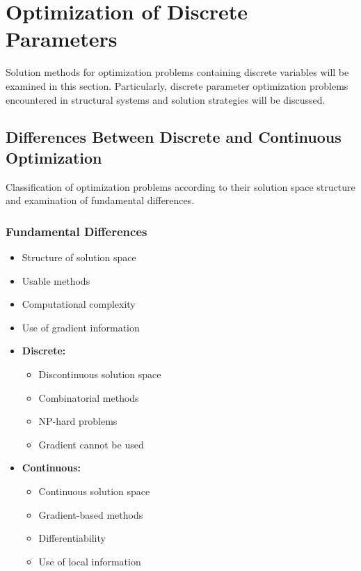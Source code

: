 \section{Optimization of Discrete Parameters}
Solution methods for optimization problems containing discrete variables will be examined in this section. Particularly, discrete parameter optimization problems encountered in structural systems and solution strategies will be discussed.

\subsection{Differences Between Discrete and Continuous Optimization}
Classification of optimization problems according to their solution space structure and examination of fundamental differences.

\subsubsection{Fundamental Differences}
\begin{itemize}
    \item Structure of solution space
    \item Usable methods
    \item Computational complexity
    \item Use of gradient information
\end{itemize}

\begin{tcolorbox}[title=Discrete vs Continuous Optimization]
\begin{itemize}
    \item \textbf{Discrete:}
        \begin{itemize}
            \item Discontinuous solution space
            \item Combinatorial methods
            \item NP-hard problems
            \item Gradient cannot be used
        \end{itemize}
    \item \textbf{Continuous:}
        \begin{itemize}
            \item Continuous solution space
            \item Gradient-based methods
            \item Differentiability
            \item Use of local information
        \end{itemize}
\end{itemize}
\end{tcolorbox}

